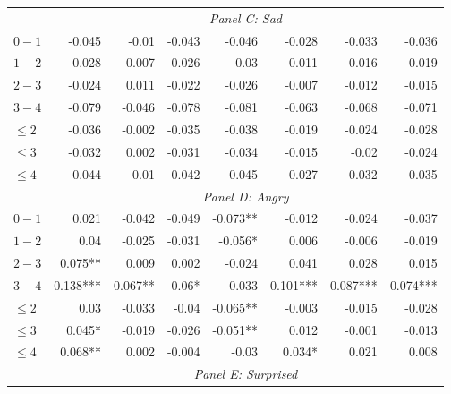 \documentclass[]{article}
\begin{document}
\begin{table}[!htb]
\begin{tabular}{lrrrrrrr}
& \multicolumn{7}{c}{\emph{Panel C: Sad}}\\ 

\cmidrule(lr){1-1} \cmidrule(lr){2-8}
$0-1$ & -0.045    & -0.01     & -0.043    & -0.046    & -0.028    & -0.033    & -0.036    \\ 
  $1-2$ & -0.028    & 0.007     & -0.026    & -0.03     & -0.011    & -0.016    & -0.019    \\ 
  $2-3$ & -0.024    & 0.011     & -0.022    & -0.026    & -0.007    & -0.012    & -0.015    \\ 
  $3-4$ & -0.079    & -0.046    & -0.078    & -0.081    & -0.063    & -0.068    & -0.071    \\ 
$\leq 2$ & -0.036    & -0.002    & -0.035    & -0.038    & -0.019    & -0.024    & -0.028    \\ 
$\leq 3$ & -0.032    & 0.002     & -0.031    & -0.034    & -0.015    & -0.02     & -0.024    \\ 
$\leq 4$ & -0.044    & -0.01     & -0.042    & -0.045    & -0.027    & -0.032    & -0.035    \\ 
\cmidrule(lr){2-8} 

& \multicolumn{7}{c}{\emph{Panel D: Angry}}\\ 

\cmidrule(lr){1-1} \cmidrule(lr){2-8}
$0-1$ & 0.021     & -0.042    & -0.049    & -0.073**  & -0.012    & -0.024    & -0.037    \\ 
  $1-2$ & 0.04      & -0.025    & -0.031    & -0.056*   & 0.006     & -0.006    & -0.019    \\ 
  $2-3$ & 0.075**   & 0.009     & 0.002     & -0.024    & 0.041     & 0.028     & 0.015     \\ 
  $3-4$ & 0.138***  & 0.067**   & 0.06*     & 0.033     & 0.101***  & 0.087***  & 0.074***  \\ 
$\leq 2$ & 0.03      & -0.033    & -0.04     & -0.065**  & -0.003    & -0.015    & -0.028    \\ 
$\leq 3$ & 0.045*    & -0.019    & -0.026    & -0.051**  & 0.012     & -0.001    & -0.013    \\ 
$\leq 4$ & 0.068**   & 0.002     & -0.004    & -0.03     & 0.034*    & 0.021     & 0.008     \\ 
\cmidrule(lr){2-8} 

& \multicolumn{7}{c}{\emph{Panel E: Surprised}}\\ 


\end{tabular}
\end{table}
\end{document}
